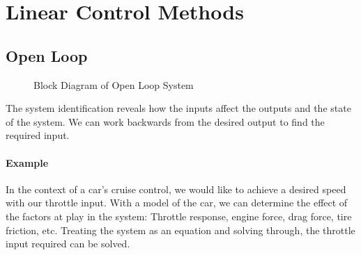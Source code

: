 \documentclass[../notes.tex]{subfiles}
\begin{document}
\section{Linear Control Methods}
\subsection{Open Loop}
\begin{figure}[H]
    \centering
    \caption{Block Diagram of Open Loop System}
    \label{fig:openBlock}
\end{figure}
The system identification reveals how the inputs affect the outputs and the state of the system. We can work backwards from the desired output to find the required input. 
\paragraph{Example} In the context of a car's cruise control, we would like to achieve a desired speed with our throttle input. With a model of the car, we can determine the effect of the factors at play in the system: Throttle response, engine force, drag force, tire friction, etc. Treating the system as an equation and solving through, the throttle input required can be solved.
\end{document}
